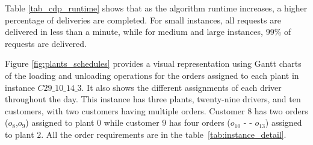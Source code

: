 Table \ref{tab_cdp_runtime} shows that as the algorithm runtime increases, a higher percentage of deliveries are completed. For small instances, all requests are delivered in less than a minute, while for medium and large instances, 99\% of requests are delivered. 

\begin{table}[htb]
    \centering
    \caption{RMC delivery completion within different runtimes of the GRASP}
    \label{tab_cdp_runtime}
    \scriptsize
\end{table}
    
Figure \ref{fig:plants_schedules} provides a visual representation using Gantt charts of the loading and unloading operations for the orders assigned to each plant in instance $C29\_10\_14\_3$. It also shows the different assignments of each driver throughout the day. This instance has three plants, twenty-nine drivers, and ten customers, with two customers having multiple orders. Customer $8$ has two orders ($o_8$,$o_9$) assigned to plant $0$ while customer $9$ has four orders ($o_{10}$ - - $o_{13}$) assigned to plant $2$. All the order requirements are in the table~\ref{tab:instance_detail}.

\begin{table}[!ht]
    \centering
    \caption{Informations of instance $C29\_10\_14\_3$}
    \label{tab:instance_detail}
\end{table}

